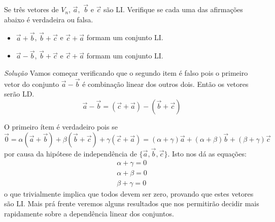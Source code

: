 \documentclass[12pt]{article}
\newcounter{questao}
\newcommand{\quest}{\stepcounter{questao}{\bf \arabic{questao}.\ }}
\begin{document}
\quest Se três vetores de $V_n$, $\vec{a},$  $\vec{b}$ e $\vec{c}$ são LI. Verifique se cada uma das afirmações abaixo é verdadeira ou falsa. 
    \begin{itemize}
        \item $\vec{a}+\vec{b}$, $\vec{b}+\vec{c}$ e $\vec{c} + \vec{a}$ formam um conjunto LI.
        
        \item $\vec{a}-\vec{b}$, $\vec{b}+\vec{c}$ e $\vec{c} + \vec{a}$ formam um conjunto LI.
    \end{itemize}

\textit{Solução}
Vamos começar verificando que o segundo item é falso pois
o primeiro vetor do conjunto $\vec{a} -\vec{b}$ é combinação linear dos outros dois. Então os vetores serão LD.
$$ \vec{a}-\vec{b} = (\vec{c}+\vec{a}) - (\vec{b}+\vec{c})$$

O primeiro ítem é verdadeiro pois se
$$\vec{0}= \alpha(\vec{a}+\vec{b}) + \beta(\vec{b}+\vec{c})+\gamma(\vec{c}+\vec{a})= (\alpha +\gamma)\vec{a}+(\alpha+\beta)\vec{b}+(\beta +\gamma)\vec{c}$$ por causa da hipótese de independência de $\{ \vec{a}, \vec{b},\vec{c}\}$. Isto nos dá as equações:
\begin{gather*}
    \alpha + \gamma = 0 \\
    \alpha + \beta = 0 \\
    \beta + \gamma = 0
\end{gather*}
o que trivialmente implica que todos devem ser zero, provando que estes vetores são LI.
Mais prá frente veremos alguns resultados que nos permitirão decidir mais rapidamente sobre a dependência linear dos conjuntos.
\end{document}
